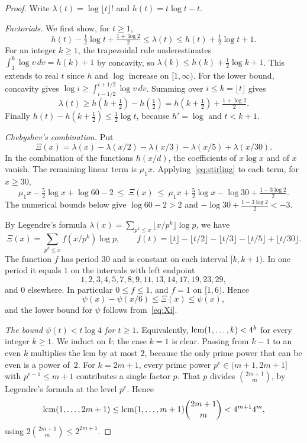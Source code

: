 \begin{proof}
Write $\lambda(t)=\log\lfloor t\rfloor!$ and $h(t)=t\log t-t$.

\emph{Factorials.} We first show, for $t\ge1$,
\begin{equation}\label{eq:stirling}
 h(t)-\tfrac12\log t+\tfrac{1+\log2}2\le\lambda(t)\le h(t)+\tfrac12\log t+1 .
\end{equation}
For an integer $k\ge1$, the trapezoidal rule underestimates $\int_1^k\log v\,dv=h(k)+1$ by concavity, so $\lambda(k)\le h(k)+\frac12\log k+1$. This extends to real $t$ since $h$ and $\log$ increase on $[1,\infty)$. For the lower bound, concavity gives $\log i\ge\int_{i-1/2}^{i+1/2}\log v\,dv$. Summing over $i\le k=\lfloor t\rfloor$ gives
\[
 \lambda(t)\ge h(k+\tfrac12)-h(\tfrac12)=h(k+\tfrac12)+\tfrac{1+\log2}{2}.
\]
Finally $h(t)-h(k+\frac12)\le\frac12\log t$, because $h'=\log$ and $t<k+1$.

\emph{Chebyshev's combination.} Put
\[
 \Xi(x)=\lambda(x)-\lambda(x/2)-\lambda(x/3)-\lambda(x/5)+\lambda(x/30).
\]
In the combination of the functions $h(x/d)$, the coefficients of $x\log x$ and of $x$ vanish. The remaining linear term is $\mu_1x$. Applying~\eqref{eq:stirling} to each term, for $x\ge30$,
\begin{equation}\label{eq:Xi}
 \mu_1x-\tfrac52\log x+\log60-2\ \le\ \Xi(x)\ \le\ \mu_1x+\tfrac52\log x-\log30+\tfrac{1-3\log2}{2}.
\end{equation}
The numerical bounds below give $\log60-2>2$ and $-\log30+\frac{1-3\log2}2<-3$.

By Legendre's formula $\lambda(x)=\sum_{p^k\le x}\lfloor x/p^k\rfloor\log p$, we have
\[
 \Xi(x)=\sum_{p^k\le x}f(x/p^k)\log p,\qquad f(t)=\lfloor t\rfloor-\lfloor t/2\rfloor-\lfloor t/3\rfloor-\lfloor t/5\rfloor+\lfloor t/30\rfloor .
\]
The function $f$ has period $30$ and is constant on each interval $[k,k+1)$. In one period it equals $1$ on the intervals with left endpoint
\[
 1,2,3,4,5,7,8,9,11,13,14,17,19,23,29,
\]
and $0$ elsewhere. In particular $0\le f\le1$, and $f=1$ on $[1,6)$. Hence
\[
 \psi(x)-\psi(x/6)\le\Xi(x)\le\psi(x),
\]
and the lower bound for $\psi$ follows from~\eqref{eq:Xi}.

\emph{The bound $\psi(t)<t\log4$ for $t\ge1$.} Equivalently, $\operatorname{lcm}(1,\dots,k)<4^k$ for every integer $k\ge1$. We induct on $k$; the case $k=1$ is clear. Passing from $k-1$ to an even $k$ multiplies the lcm by at most $2$, because the only prime power that can be even is a power of~$2$. For $k=2m+1$, every prime power $p^e\in(m+1,2m+1]$ with $p^{e-1}\le m+1$ contributes a single factor $p$. That $p$ divides $\binom{2m+1}{m}$, by Legendre's formula at the level $p^e$. Hence
\[
 \operatorname{lcm}(1,\dots,2m+1)\le\operatorname{lcm}(1,\dots,m+1)\binom{2m+1}{m}<4^{m+1}4^m ,
\]
using $2\binom{2m+1}{m}\le2^{2m+1}$.


\end{proof}
